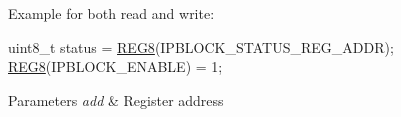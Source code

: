 Example for both read and write\-:


\begin{DoxyCode}
uint8\_t status = \hyperlink{group__or1k__macros_gafc0a6781cfc826214401f1694b196010}{REG8}(IPBLOCK\_STATUS\_REG\_ADDR);
\hyperlink{group__or1k__macros_gafc0a6781cfc826214401f1694b196010}{REG8}(IPBLOCK\_ENABLE) = 1;
\end{DoxyCode}



\begin{DoxyParams}{Parameters}
{\em add} & Register address \\
\hline
\end{DoxyParams}
